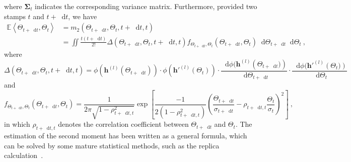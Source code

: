 \documentclass[review,10pt]{JMtemplate}
\newcommand*{\dif}{\mathop{}\!\mathrm{d}}
\begin{document}
where $\mathbf{\Sigma}_t$ indicates the corresponding variance matrix. Furthermore, provided two stamps $t$ and $t+\dif t$, we have
\[
\begin{aligned}
    \mathbb{E} \left\langle \Theta_{t+\dif t}, \Theta_t  \right\rangle &= m_2( \Theta_{t+\dif t}, \Theta_t, t+\dif t, t ) \\
    &= \iint \frac{t (t+\dif t)}{2!} \Delta \left( \Theta_{t+\dif t}, \Theta_t, t+\dif t, t \right) f_{\Theta_{t+\dif t},\Theta_t} \left( \Theta_{t+\dif t}, \Theta_t \right) \dif \Theta_{t+\dif t} \dif \Theta_t \ ,
\end{aligned}
\]
where
\[
\Delta \left( \Theta_{t+\dif t}, \Theta_t, t+\dif t, t \right) = 
\phi \left( \boldsymbol{h}^{(l)} (\Theta_{t+\dif t}) \right) \cdot \phi \left( \boldsymbol{h}'^{(l)} (\Theta_t) \right) \cdot \frac{\dif \phi(\boldsymbol{h}^{(l)} \left( \Theta_{t+\dif t}) \right)}{\dif \Theta_{t+\dif t}} \cdot \frac{\dif \phi(\boldsymbol{h}'^{(l)} \left( \Theta_t) \right)}{\dif \Theta_t} 
\]
and
\[
f_{\Theta_{t+\dif t},\Theta_t} \left( \Theta_{t+\dif t}, \Theta_t \right) = 
\frac{1}{2\pi\sqrt{1-\rho_{t+\dif t, t}^2} } \exp \left[ \frac{-1}{2(1-\rho_{t+\dif t, t}^2)} \left( \frac{\Theta_{t+\dif t}}{\sigma_{t+\dif t}} - \rho_{t+\dif t,t}\frac{\Theta_t}{\sigma_t} \right)^2 \right] \ ,
\]
in which $\rho_{t+\dif t, t}$ denotes the correlation coefficient between $\Theta_{t+\dif t}$ and $\Theta_t$. The estimation of the second moment has been written as a general formula, which can be solved by some mature statistical methods, such as the replica calculation~\citep{mezard1987:Replica}. 
\end{document}
